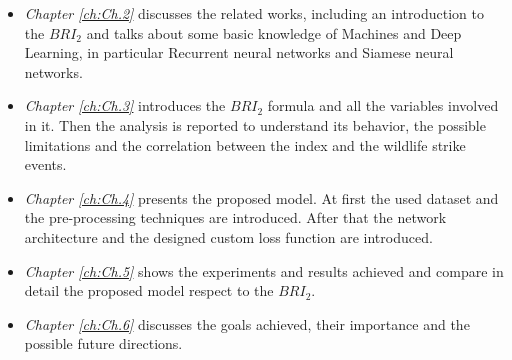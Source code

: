 \begin{itemize}
    \item \textit{Chapter \ref{ch:Ch.2}} discusses the related works, including an introduction to the $BRI_2$ and talks about some basic knowledge of Machines and Deep Learning, in particular Recurrent neural networks and Siamese neural networks.
    \item \textit{Chapter \ref{ch:Ch.3}} introduces the $BRI_2$ formula and all the variables involved in it.
    Then the analysis is reported to understand its behavior, the possible limitations and the correlation between the index and the wildlife strike events.
    \item \textit{Chapter \ref{ch:Ch.4}} presents the proposed model. At first the used dataset and the pre-processing techniques are introduced. After that the network architecture and the designed custom loss function are introduced.
    \item \textit{Chapter \ref{ch:Ch.5}} shows the experiments and results achieved and compare in detail the proposed model respect to the $BRI_2$.
    \item \textit{Chapter \ref{ch:Ch.6}} discusses the goals achieved, their importance and the possible future directions.
\end{itemize}




